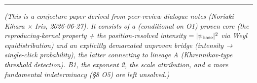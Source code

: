 \documentclass[
]{ltjsarticle}
\begin{document}
\begin{center}\rule{0.5\linewidth}{0.5pt}\end{center}

\emph{(This is a conjecture paper derived from peer-review dialogue
notes (Noriaki Kihara × Iris, 2026-06-27). It consists of a (conditional
on O1) proven core (the reproducing-kernel property + the
position-resolved intensity \(=|\psi_{\rm base}|^2\) via Weyl
equidistribution) and an explicitly demarcated unproven bridge
(intensity → single-click probability), the latter connecting to lineage
A (Khrennikov-type threshold detection). B1, the exponent 2, the scale
attribution, and a more fundamental indeterminacy (§8 O5) are left
unsolved.)}
\end{document}
